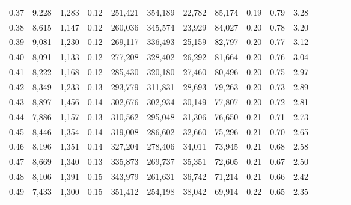 \begin{tabular}{rrrcrrrrrrrrrrr}
0.37 &   9,228 &   1,283 &                                       0.12 &  251,421 &  354,189 &   22,782 &   85,174 &  0.19 &  0.79 &                         3.28 \\
0.38 &   8,615 &   1,147 &                                       0.12 &  260,036 &  345,574 &   23,929 &   84,027 &  0.20 &  0.78 &                         3.20 \\
0.39 &   9,081 &   1,230 &                                       0.12 &  269,117 &  336,493 &   25,159 &   82,797 &  0.20 &  0.77 &                         3.12 \\
0.40 &   8,091 &   1,133 &                                       0.12 &  277,208 &  328,402 &   26,292 &   81,664 &  0.20 &  0.76 &                         3.04 \\
0.41 &   8,222 &   1,168 &                                       0.12 &  285,430 &  320,180 &   27,460 &   80,496 &  0.20 &  0.75 &                         2.97 \\
0.42 &   8,349 &   1,233 &                                       0.13 &  293,779 &  311,831 &   28,693 &   79,263 &  0.20 &  0.73 &                         2.89 \\
0.43 &   8,897 &   1,456 &                                       0.14 &  302,676 &  302,934 &   30,149 &   77,807 &  0.20 &  0.72 &                         2.81 \\
0.44 &   7,886 &   1,157 &                                       0.13 &  310,562 &  295,048 &   31,306 &   76,650 &  0.21 &  0.71 &                         2.73 \\
0.45 &   8,446 &   1,354 &                                       0.14 &  319,008 &  286,602 &   32,660 &   75,296 &  0.21 &  0.70 &                         2.65 \\
0.46 &   8,196 &   1,351 &                                       0.14 &  327,204 &  278,406 &   34,011 &   73,945 &  0.21 &  0.68 &                         2.58 \\
0.47 &   8,669 &   1,340 &                                       0.13 &  335,873 &  269,737 &   35,351 &   72,605 &  0.21 &  0.67 &                         2.50 \\
0.48 &   8,106 &   1,391 &                                       0.15 &  343,979 &  261,631 &   36,742 &   71,214 &  0.21 &  0.66 &                         2.42 \\
0.49 &   7,433 &   1,300 &                                       0.15 &  351,412 &  254,198 &   38,042 &   69,914 &  0.22 &  0.65 &                         2.35 \\

\end{tabular}

